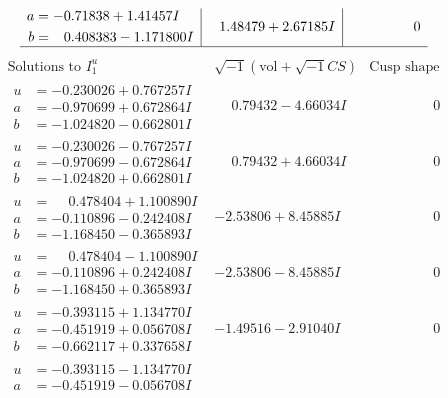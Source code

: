\documentclass[1p]{elsarticle_modified}
\theoremstyle{definition}
\newcommand{\I}{\sqrt{-1}}
\begin{document}
$$\begin{array}{c|c|c}
\begin{aligned}
a &= -0.71838 + 1.41457 I \\
b &= \phantom{-}0.408383 - 1.171800 I\end{aligned}
 & \phantom{-}1.48479 + 2.67185 I & \phantom{-0.000000 } 0\\
 \hline 
 \end{array}$$\newpage$$\begin{array}{c|c|c}  
\text{Solutions to }I^u_{1}& \I (\text{vol} + \sqrt{-1}CS) & \text{Cusp shape}\\
 \hline 
\begin{aligned}
u &= -0.230026 + 0.767257 I \\
a &= -0.970699 + 0.672864 I \\
b &= -1.024820 - 0.662801 I\end{aligned}
 & \phantom{-}0.79432 - 4.66034 I & \phantom{-0.000000 } 0 \\ \hline\begin{aligned}
u &= -0.230026 - 0.767257 I \\
a &= -0.970699 - 0.672864 I \\
b &= -1.024820 + 0.662801 I\end{aligned}
 & \phantom{-}0.79432 + 4.66034 I & \phantom{-0.000000 } 0 \\ \hline\begin{aligned}
u &= \phantom{-}0.478404 + 1.100890 I \\
a &= -0.110896 - 0.242408 I \\
b &= -1.168450 - 0.365893 I\end{aligned}
 & -2.53806 + 8.45885 I & \phantom{-0.000000 } 0 \\ \hline\begin{aligned}
u &= \phantom{-}0.478404 - 1.100890 I \\
a &= -0.110896 + 0.242408 I \\
b &= -1.168450 + 0.365893 I\end{aligned}
 & -2.53806 - 8.45885 I & \phantom{-0.000000 } 0 \\ \hline\begin{aligned}
u &= -0.393115 + 1.134770 I \\
a &= -0.451919 + 0.056708 I \\
b &= -0.662117 + 0.337658 I\end{aligned}
 & -1.49516 - 2.91040 I & \phantom{-0.000000 } 0 \\ \hline\begin{aligned}
u &= -0.393115 - 1.134770 I \\
a &= -0.451919 - 0.056708 I \\

\end{aligned}
\end{array}$$
\end{document}
